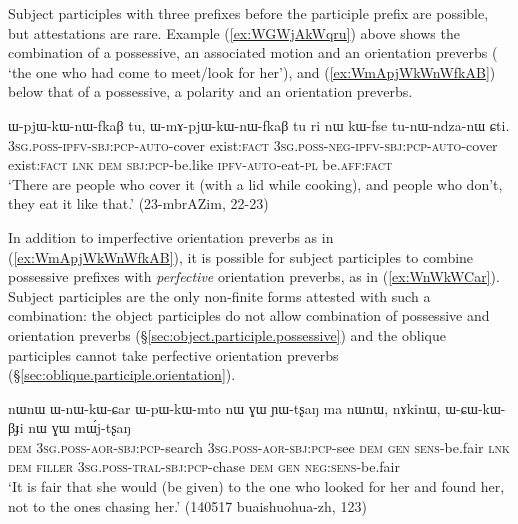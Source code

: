 Subject participles with three prefixes before the participle prefix  are possible, but attestations are rare. Example (\ref{ex:WGWjAkWqru}) above shows the combination of a possessive, an associated motion and an orientation preverbs ( `the one who had come to meet/look for her'), and (\ref{ex:WmApjWkWnWfkAB}) below that of a possessive, a polarity and an orientation preverbs.

\begin{exe}
\ex \label{ex:WmApjWkWnWfkAB}
 \gll ɯ-pjɯ-kɯ-nɯ-fkaβ tu, ɯ-mɤ-pjɯ-kɯ-nɯ-fkaβ tu ri nɯ kɯ-fse tu-nɯ-ndza-nɯ ɕti. \\
 \textsc{3sg}.\textsc{poss}-\textsc{ipfv}-\textsc{sbj}:\textsc{pcp}-\textsc{auto}-cover exist:\textsc{fact}  \textsc{3sg}.\textsc{poss}-\textsc{neg}-\textsc{ipfv}-\textsc{sbj}:\textsc{pcp}-\textsc{auto}-cover exist:\textsc{fact} \textsc{lnk} \textsc{dem} \textsc{sbj}:\textsc{pcp}-be.like \textsc{ipfv}-\textsc{auto}-eat-\textsc{pl} be.\textsc{aff}:\textsc{fact} \\
 \glt `There are people who cover it (with a lid while cooking), and people who don't, they eat it like that.' (23-mbrAZim, 22-23)
\end{exe}

In addition to imperfective orientation preverbs as in (\ref{ex:WmApjWkWnWfkAB}), it is possible for subject participles to combine possessive prefixes with \textit{perfective} orientation preverbs, as in (\ref{ex:WnWkWCar}). Subject participles are the only non-finite forms attested with such a combination: the object participles do not allow combination of possessive and orientation preverbs (§\ref{sec:object.participle.possessive}) and the oblique participles cannot take perfective orientation preverbs (§\ref{sec:oblique.participle.orientation}).

 \begin{exe} 
\ex \label{ex:WnWkWCar}
\gll nɯnɯ ɯ-nɯ-kɯ-ɕar ɯ-pɯ-kɯ-mto nɯ ɣɯ ɲɯ-tʂaŋ ma nɯnɯ, nɤkinɯ, ɯ-ɕɯ-kɯ-βɟi nɯ ɣɯ mɯ́j-tʂaŋ \\
\textsc{dem} \textsc{3sg}.\textsc{poss}-\textsc{aor}-\textsc{sbj}:\textsc{pcp}-search \textsc{3sg}.\textsc{poss}-\textsc{aor}-\textsc{sbj}:\textsc{pcp}-see \textsc{dem} \textsc{gen} \textsc{sens}-be.fair \textsc{lnk} \textsc{dem} \textsc{filler} \textsc{3sg}.\textsc{poss}-\textsc{tral}-\textsc{sbj}:\textsc{pcp}-chase \textsc{dem} \textsc{gen} \textsc{neg}:\textsc{sens}-be.fair \\
\glt `It is fair that she would (be given) to the one who looked for her and found her, not to the ones chasing her.' (140517 buaishuohua-zh, 123)
\end{exe}


